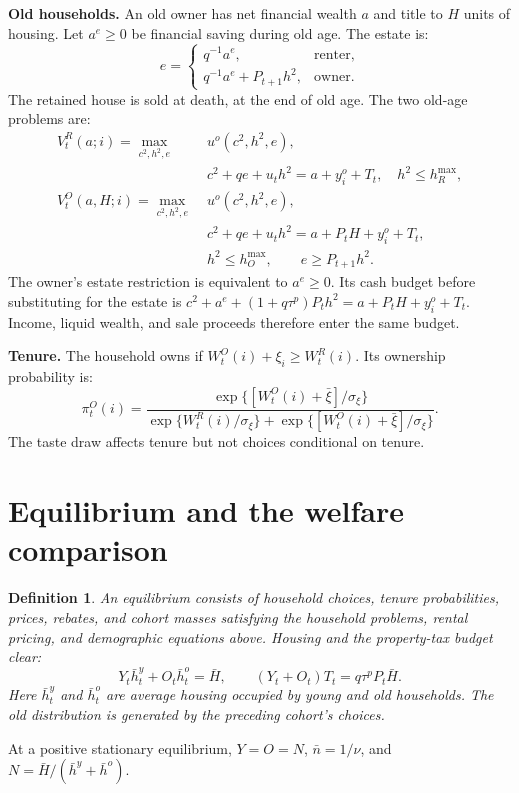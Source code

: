 \documentclass[11pt]{article}
\newtheorem{definition}{Definition}
\begin{document}
\textbf{Old households.} An old owner has net financial wealth $a$ and title
to $H$ units of housing. Let $a^e\ge0$ be financial saving during old age.
The estate is:
\begin{equation}
e=\begin{cases}
q^{-1}a^e,&\text{renter},\\
q^{-1}a^e+P_{t+1}h^2,&\text{owner}.
\end{cases}
\label{eq:new_estate}
\end{equation}
The retained house is sold at death, at the end of old age. The two old-age
problems are:
\begin{align}
V_t^R(a;i)=\max_{c^2,h^2,e}\;&u^o(c^2,h^2,e),\nonumber\\
&c^2+qe+u_th^2=a+y_i^o+T_t,\quad h^2\le h_R^{\max},
\label{eq:new_old_renter}\\
V_t^O(a,H;i)=\max_{c^2,h^2,e}\;&u^o(c^2,h^2,e),\nonumber\\
&c^2+qe+u_th^2=a+P_tH+y_i^o+T_t,\nonumber\\
&h^2\le h_O^{\max},\qquad e\ge P_{t+1}h^2.
\label{eq:new_old_owner}
\end{align}
The owner's estate restriction is equivalent to $a^e\ge0$. Its cash budget
before substituting for the estate is
$c^2+a^e+(1+q\tau^p)P_th^2=a+P_tH+y_i^o+T_t$.
Income, liquid wealth, and sale proceeds therefore enter the same budget.

\textbf{Tenure.} The household owns if $W_t^O(i)+\xi_i\ge W_t^R(i)$.
Its ownership probability is:
\begin{equation}
\pi_t^O(i)=
\frac{\exp\{[W_t^O(i)+\bar\xi]/\sigma_\xi\}}
{\exp\{W_t^R(i)/\sigma_\xi\}+\exp\{[W_t^O(i)+\bar\xi]/\sigma_\xi\}}.
\label{eq:new_tenure}
\end{equation}
The taste draw affects tenure but not choices conditional on tenure.

\section{Equilibrium and the welfare comparison}

\begin{definition}
An equilibrium consists of household choices, tenure probabilities, prices,
rebates, and cohort masses satisfying the household problems, rental pricing,
and demographic equations above. Housing and the property-tax budget clear:
\begin{equation}
Y_t\bar h_t^y+O_t\bar h_t^o=\bar H,
\qquad (Y_t+O_t)T_t=q\tau^pP_t\bar H.
\label{eq:clearing}
\end{equation}
Here $\bar h_t^y$ and $\bar h_t^o$ are average housing occupied by young and old households.
The old distribution is generated by the preceding cohort's choices.
\end{definition}
At a positive stationary equilibrium, $Y=O=N$, $\bar n=1/\nu$, and
$N=\bar H/(\bar h^y+\bar h^o)$.
\end{document}
